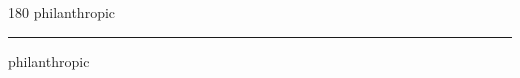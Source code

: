 
\begin{frame}
\begin{center}
\begin{turn}{180}
{\fontsize{2.5cm}{1em}\selectfont philanthropic}
\end{turn}
\vspace{1em}\par  
\hrule
\vspace{1em}\par  
{\fontsize{2.5cm}{1em}\selectfont philanthropic}
\end{center}
\end{frame}
